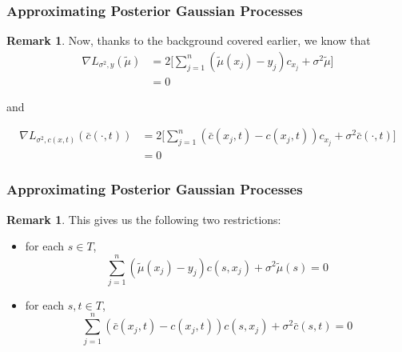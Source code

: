 \documentclass[notheorems]{beamer}
\theoremstyle{definition}
\newtheorem{rem}[definition]{Remark}
\newcommand{\sig}{\sigma}
\begin{document}
\begin{frame}
\frametitle{Approximating Posterior Gaussian Processes}
\begin{rem}
Now, thanks to the background covered earlier, we know that 
\begin{align*}
\nabla L_{\sig^2, y}(\tilde{\mu}) 
&= 2\bigg [ \sum_{j=1}^n (\tilde{\mu}(x_j)- y_j) c_{x_j} + \sig^2 \tilde{\mu}\bigg ]\\
&= 0
\end{align*}


 and 
 
 \begin{align*}
 \nabla L_{\sig^2, c(x,t)}(\bar{c}(\cdot, t))
 &= 2\bigg [ \sum_{j=1}^n (\bar{c}(x_j, t)- c(x_j,t)) c_{x_j} + \sig^2 \bar{c}(\cdot, t)\bigg ] \\
 &= 0
 \end{align*}
 
 
\end{rem}
\end{frame}















\begin{frame}
\frametitle{Approximating Posterior Gaussian Processes}
\begin{rem}
This gives us the following two restrictions: 

\begin{itemize}
\item for each $s \in T$, 
$$\sum_{j=1}^n (\tilde{\mu}(x_j)- y_j) c(s, x_j) + \sig^2 \tilde{\mu}(s)  = 0$$
\item for each $s,t \in T$,
$$\sum_{j=1}^n (\bar{c}(x_j, t)- c(x_j,t)) c(s, x_j) + \sig^2 \bar{c}(s, t) = 0$$
\end{itemize}
\end{rem}

\end{frame}
\end{document}

